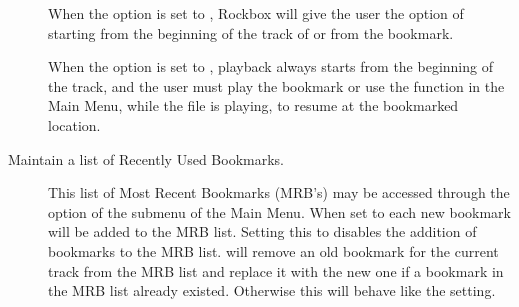 \begin{description}
  When the  option is set to , Rockbox will
  give the user the option of starting from the beginning of the track
  of or from the bookmark. 

  When the  option is set to , playback always
  starts from the beginning of the track, and the user must play the bookmark
  or use the  function in the Main Menu, while the file
  is playing, to resume at the bookmarked location.
    
  \item [Maintain a list of Recently Used Bookmarks. ]

  This list of Most Recent Bookmarks (MRB's) may be accessed through the
   option of the  submenu of the 
  Main Menu. When set to  each new bookmark will be added to the
  MRB list. Setting this to  disables the addition of bookmarks to
  the MRB list.  will remove an old bookmark for the current
  track from the MRB list and replace it with the new one if a bookmark in the
  MRB list already existed. Otherwise this will behave like the 
   setting.
  \end{description}

